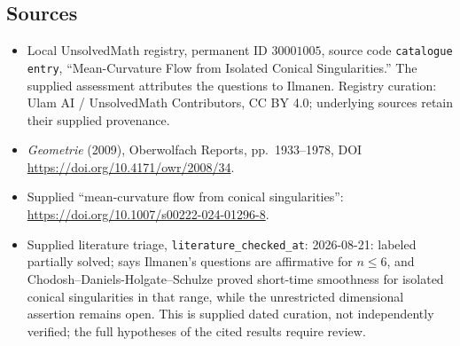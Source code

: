 \documentclass[11pt]{article}
\begin{document}
\subsection{Sources}
\begin{itemize}
\item Local UnsolvedMath registry, permanent ID \(30001005\), source code \texttt{catalogue entry}, ``Mean-Curvature Flow from Isolated Conical Singularities.'' The supplied assessment attributes the questions to Ilmanen. Registry curation: Ulam AI / UnsolvedMath Contributors, CC BY 4.0; underlying sources retain their supplied provenance.
\item \emph{Geometrie} (2009), Oberwolfach Reports, pp.\ 1933--1978, DOI \url{https://doi.org/10.4171/owr/2008/34}.
\item Supplied ``mean-curvature flow from conical singularities'': \url{https://doi.org/10.1007/s00222-024-01296-8}.
\item Supplied literature triage, \texttt{literature\_checked\_at}: 2026-08-21: labeled partially solved; says Ilmanen's questions are affirmative for \(n\leq6\), and Chodosh--Daniels-Holgate--Schulze proved short-time smoothness for isolated conical singularities in that range, while the unrestricted dimensional assertion remains open. This is supplied dated curation, not independently verified; the full hypotheses of the cited results require review.
\end{itemize}
\end{document}
